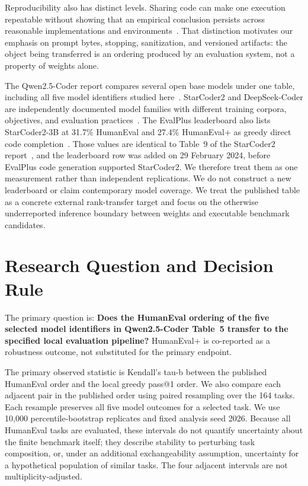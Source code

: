 \documentclass[10pt,twocolumn]{article}
\begin{document}
Reproducibility also has distinct levels. Sharing code can make one execution repeatable without showing that an empirical conclusion persists across reasonable implementations and environments~\citep{bouthillier2019reproducible}. That distinction motivates our emphasis on prompt bytes, stopping, sanitization, and versioned artifacts: the object being transferred is an ordering produced by an evaluation system, not a property of weights alone.

The Qwen2.5-Coder report compares several open base models under one table, including all five model identifiers studied here~\citep{hui2024qwen25coder}. StarCoder2 and DeepSeek-Coder are independently documented model families with different training corpora, objectives, and evaluation practices~\citep{lozhkov2024starcoder2,guo2024deepseekcoder}. The EvalPlus leaderboard also lists StarCoder2-3B at 31.7\% HumanEval and 27.4\% HumanEval+ as greedy direct code completion~\citep{evalplus2026leaderboard,evalplus2026setup}. Those values are identical to Table~9 of the StarCoder2 report~\citep{lozhkov2024starcoder2}, and the leaderboard row was added on 29 February 2024, before EvalPlus code generation supported StarCoder2. We therefore treat them as one measurement rather than independent replications. We do not construct a new leaderboard or claim contemporary model coverage. We treat the published table as a concrete external rank-transfer target and focus on the otherwise underreported inference boundary between weights and executable benchmark candidates.

\section{Research Question and Decision Rule}

The primary question is: \textbf{Does the HumanEval ordering of the five selected model identifiers in Qwen2.5-Coder Table~5 transfer to the specified local evaluation pipeline?} HumanEval+ is co-reported as a robustness outcome, not substituted for the primary endpoint.

The primary observed statistic is Kendall's tau-b between the published HumanEval order and the local greedy pass@1 order. We also compare each adjacent pair in the published order using paired resampling over the 164 tasks. Each resample preserves all five model outcomes for a selected task. We use 10,000 percentile-bootstrap replicates and fixed analysis seed 2026. Because all HumanEval tasks are evaluated, these intervals do not quantify uncertainty about the finite benchmark itself; they describe stability to perturbing task composition, or, under an additional exchangeability assumption, uncertainty for a hypothetical population of similar tasks. The four adjacent intervals are not multiplicity-adjusted.
\end{document}
